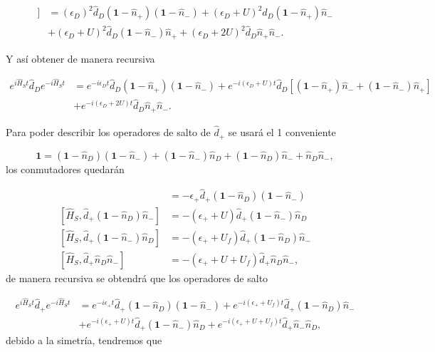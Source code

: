 \begin{appendixs}
\begin{align*}
    [\hat{H}_{S},[\hat{H}_{S},\hat{d}_{D}]] & = (\epsilon_{D})^{2}\hat{d}_{D}(\textbf{1} - \hat{n}_{+}) (\textbf{1} - \hat{n}_{-}) + (\epsilon_{D} + U)^{2}\hat{d}_{D}(\textbf{1} - \hat{n}_{+})\hat{n}_{-} \\
        & + (\epsilon_{D}+U)^{2}\hat{d}_{D}(\textbf{1} - \hat{n}_{-})\hat{n}_{+} + (\epsilon_{D} + 2U)^{2}\hat{d}_{D}\hat{n}_{+}\hat{n}_{-}.
\end{align*}

Y así obtener de manera recursiva

\begin{align*}
    e^{i \hat{H}_{S}t}\hat{d}_{D}e^{-i\hat{H}_{S}t}  & = e^{-i\epsilon_{D}t} \hat{d}_{D}(\textbf{1} - \hat{n}_{+}) (\textbf{1} - \hat{n}_{-}) +  e^{-i(\epsilon_{D}+U)t} \hat{d}_{D}[(\textbf{1} - \hat{n}_{+})\hat{n}_{-} + (\textbf{1} - \hat{n}_{-})\hat{n}_{+}] \\
    & + e^{-i(\epsilon_{D} + 2U)t}\hat{d}_{D} \hat{n}_{+}\hat{n}_{-}.
\end{align*}

Para poder describir los operadores de salto de $\hat{d}_{+}$ se usará el 1 conveniente

\begin{equation*}
    \textbf{1} = (\textbf{1}-\hat{n}_{D})(\textbf{1}-\hat{n}_{-}) + (\textbf{1}-\hat{n}_{-})\hat{n}_{D} + (\textbf{1}-\hat{n}_{D})\hat{n}_{-} + \hat{n}_{D}\hat{n}_{-},
\end{equation*}
los conmutadores quedarán

\begin{align*}
    [\hat{H}_{S},\hat{d}_{+}(\textbf{1}-\hat{n}_{D})(\textbf{1} - \hat{n}_{-})] & = - \epsilon_{+}\hat{d}_{+}(\textbf{1}-\hat{n}_{D})(\textbf{1} - \hat{n}_{-}) \\
    [\hat{H}_{S},\hat{d}_{+}(\textbf{1}-\hat{n}_{D})\hat{n}_{-}] & = - (\epsilon_{+} + U)\hat{d}_{+}(\textbf{1} - \hat{n}_{-})\hat{n}_{D} \\
    [\hat{H}_{S},\hat{d}_{+}(\textbf{1}-\hat{n}_{-})\hat{n}_{D}] & = - (\epsilon_{+} + U_{f})\hat{d}_{+}(\textbf{1} - \hat{n}_{D})\hat{n}_{-} \\
    [\hat{H}_{S},\hat{d}_{+}\hat{n}_{D}\hat{n}_{-}] & = - (\epsilon_{+} + U + U_{f})\hat{d}_{+}\hat{n}_{D}\hat{n}_{-}, 
\end{align*}
de manera recursiva se obtendrá que los operadores de salto

\begin{align*}
    e^{i \hat{H}_{S}t}\hat{d}_{+}e^{-i\hat{H}_{S}t} & = e^{-i\epsilon_{+}t}\hat{d}_{+}(\textbf{1}-\hat{n}_{D})(\textbf{1}-\hat{n}_{-}) + e^{-i(\epsilon_{+}+U_{f})t} \hat{d}_{+}(\textbf{1}-\hat{n}_{D})\hat{n}_{-} \\
    & + e^{-i(\epsilon_{+}+U)t}\hat{d}_{+}(\textbf{1}-\hat{n}_{-})\hat{n}_{D} + e^{-i(\epsilon_{+}+U+U_{f})t}\hat{d}_{+}\hat{n}_{-}\hat{n}_{D},
\end{align*}
debido a la simetría, tendremos que


\end{appendixs}
